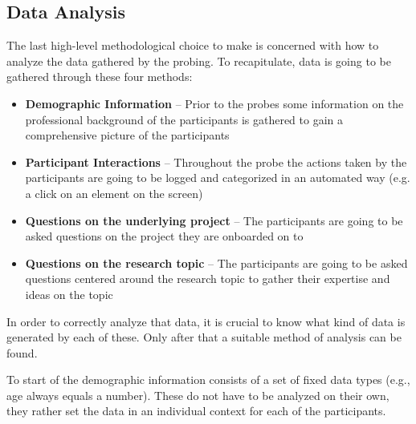 \subsection{Data Analysis}

The last high-level methodological choice to make is concerned with how to analyze the data gathered by the probing. To recapitulate, data is going to be gathered through these four methods:

\begin{itemize}
  \item{\textbf{Demographic Information} -- Prior to the probes some information on the professional background of the participants is gathered to gain a comprehensive picture of the participants}
  \item{\textbf{Participant Interactions} -- Throughout the probe the actions taken by the participants are going to be logged and categorized in an automated way (e.g. a click on an element on the screen)}
  \item{\textbf{Questions on the underlying project} -- The participants are going to be asked questions on the project they are onboarded on to}
  \item{\textbf{Questions on the research topic} -- The participants are going to be asked questions centered around the research topic to gather their expertise and ideas on the topic}
\end{itemize}

In order to correctly analyze that data, it is crucial to know what kind of data is generated by each of these. Only after that a suitable method of analysis can be found.

To start of the demographic information consists of a set of fixed data types (e.g., age always equals a number). These do not have to be analyzed on their own, they rather set the data in an individual context for each of the participants.

